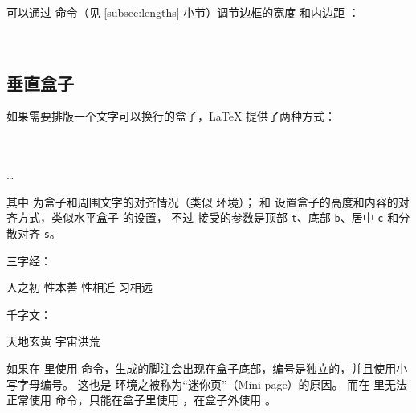 可以通过  命令（见 \ref{subsec:lengths} 小节）调节边框的宽度  和内边距 ：
\begin{example}
\\[1ex]
\setlength{\fboxrule}{1.6pt}
\setlength{\fboxsep}{1em}
\end{example}

\subsection{垂直盒子}\label{subsec:parbox}

如果需要排版一个文字可以换行的盒子，\LaTeX{} 提供了两种方式：
\begin{command}
\marg*{\ldots} \\[0.5ex]
 \\
\ldots \\
\end{command}

其中  为盒子和周围文字的对齐情况（类似  环境）；
 和  设置盒子的高度和内容的对齐方式，类似水平盒子  的设置，
不过  接受的参数是顶部 \texttt{t}、底部 \texttt{b}、居中 \texttt{c} 和分散对齐 \texttt{s}。

\begin{example}
三字经：\parbox[t]{3em}%
{人之初 性本善 性相近 习相远}
\quad
千字文：
\begin{minipage}[b][8ex][t]{4em}
天地玄黄 宇宙洪荒
\end{minipage}
\end{example}

如果在  里使用  命令，生成的脚注会出现在盒子底部，编号是独立的，并且使用小写字母编号。
这也是  环境之被称为“迷你页”（Mini-page）的原因。
而在  里无法正常使用  命令，只能在盒子里使用 ，在盒子外使用 。
\begin{example}
\end{example}


